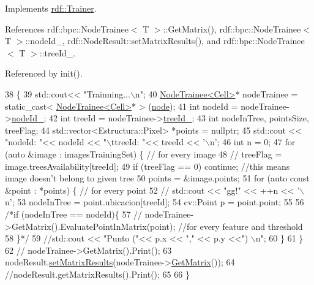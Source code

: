Implements \hyperlink{classrdf_1_1Trainer_ac4282d6110800b6ecc2d1a16d0afe349}{rdf\+::\+Trainer}.



References rdf\+::bpc\+::\+Node\+Trainee$<$ T $>$\+::\+Get\+Matrix(), rdf\+::bpc\+::\+Node\+Trainee$<$ T $>$\+::node\+Id\+\_\+, rdf\+::\+Node\+Result\+::set\+Matrix\+Results(), and rdf\+::bpc\+::\+Node\+Trainee$<$ T $>$\+::tree\+Id\+\_\+.



Referenced by init().


\begin{DoxyCode}
38                                                                                                        \{
39   std::cout<< \textcolor{stringliteral}{"Trainning...\(\backslash\)n"};
40   \hyperlink{classrdf_1_1bpc_1_1NodeTrainee}{NodeTrainee<Cell>}* nodeTrainee = \textcolor{keyword}{static\_cast<}
      \hyperlink{classrdf_1_1bpc_1_1NodeTrainee}{NodeTrainee<Cell>}* \textcolor{keyword}{>} (\hyperlink{structQueueTask_1_1TaskStruct_a22eb8e22f500809266c4983897b9af7f}{node});
41   \textcolor{keywordtype}{int} nodeId =  nodeTrainee->\hyperlink{classrdf_1_1bpc_1_1NodeTrainee_a208e3eafbece621b9618f6e3ddd27947}{nodeId\_};
42   \textcolor{keywordtype}{int} treeId =  nodeTrainee->\hyperlink{classrdf_1_1bpc_1_1NodeTrainee_a04ec4bdb96ed7d47ab99e6a4f65294f3}{treeId\_};
43   \textcolor{keywordtype}{int} nodeInTree, pointsSize, treeFlag;
44   std::vector<Estructura::Pixel> *points = \textcolor{keyword}{nullptr};
45   std::cout << \textcolor{stringliteral}{"nodeId: "}<< nodeId << \textcolor{stringliteral}{"\(\backslash\)ttreeId: "}<< treeId << \textcolor{charliteral}{'\(\backslash\)n'};
46   \textcolor{keywordtype}{int} n = 0;
47   \textcolor{keywordflow}{for} (\textcolor{keyword}{auto} &image : imagesTrainingSet) \{ \textcolor{comment}{// for every image}
48     \textcolor{comment}{// treeFlag = image.treesAvailability[treeId];}
49      \textcolor{keywordflow}{if} (treeFlag == 0) \textcolor{keywordflow}{continue}; \textcolor{comment}{//this means image doesn't belong to given tree}
50       points = &image.points;
51       \textcolor{keywordflow}{for} (\textcolor{keyword}{auto} \textcolor{keyword}{const} &point : *points) \{           \textcolor{comment}{// for every point}
52         \textcolor{comment}{// std::cout << "gg!" << ++n << '\(\backslash\)n';}
53             nodeInTree = point.ubicacion[treeId];
54             cv::Point p = point.point;
55             
56             \textcolor{comment}{/*if (nodeInTree == nodeId)\{}
57 \textcolor{comment}{               // nodeTrainee->GetMatrix().EvaluatePointInMatrix(point); //for every feature and threshold}
58 \textcolor{comment}{            \}*/}
59           \textcolor{comment}{//std::cout << "Punto ("<< p.x << "," << p.y <<") \(\backslash\)n"; }
60         \}
61   \}
62 \textcolor{comment}{//  nodeTrainee->GetMatrix().Print();}
63    nodeResult.\hyperlink{classrdf_1_1NodeResult_a22523db74203c1926eb1a09da19b5f27}{setMatrixResults}(nodeTrainee->\hyperlink{classrdf_1_1bpc_1_1NodeTrainee_ab1ae16941f52a5f38e438b13ed3cee53}{GetMatrix}());
64   \textcolor{comment}{//nodeResult.getMatrixResults().Print();}
65   
66 \}
\end{DoxyCode}


